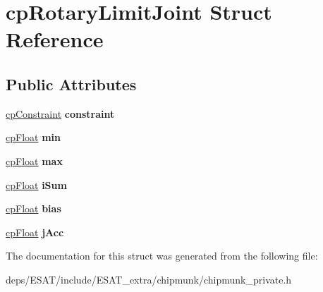 \hypertarget{structcp_rotary_limit_joint}{}\section{cp\+Rotary\+Limit\+Joint Struct Reference}
\label{structcp_rotary_limit_joint}
\subsection*{Public Attributes}
\begin{DoxyCompactItemize}
\item 
\mbox{\label{structcp_rotary_limit_joint_a447ab04f7ecace3c2cb7a9ad19e974ff}} 
\mbox{\hyperlink{structcp_constraint}{cp\+Constraint}} {\bfseries constraint}
\item 
\mbox{\label{structcp_rotary_limit_joint_aa189b3e6886001824f2ae140d69c7322}} 
\mbox{\hyperlink{group__basic_types_gac1ed65573e035bf892505768c852d8d3}{cp\+Float}} {\bfseries min}
\item 
\mbox{\label{structcp_rotary_limit_joint_a0706d6b4bcefcf85838256418ed3283e}} 
\mbox{\hyperlink{group__basic_types_gac1ed65573e035bf892505768c852d8d3}{cp\+Float}} {\bfseries max}
\item 
\mbox{\label{structcp_rotary_limit_joint_a5ec0c0943aa2f6afb90b114b8878bef5}} 
\mbox{\hyperlink{group__basic_types_gac1ed65573e035bf892505768c852d8d3}{cp\+Float}} {\bfseries i\+Sum}
\item 
\mbox{\label{structcp_rotary_limit_joint_a33bcd5092edad3f9e2d251c17fc18679}} 
\mbox{\hyperlink{group__basic_types_gac1ed65573e035bf892505768c852d8d3}{cp\+Float}} {\bfseries bias}
\item 
\mbox{\label{structcp_rotary_limit_joint_acd814943fe9a4065927ce4071d70adfd}} 
\mbox{\hyperlink{group__basic_types_gac1ed65573e035bf892505768c852d8d3}{cp\+Float}} {\bfseries j\+Acc}
\end{DoxyCompactItemize}


The documentation for this struct was generated from the following file\+:\begin{DoxyCompactItemize}
\item 
deps/\+E\+S\+A\+T/include/\+E\+S\+A\+T\+\_\+extra/chipmunk/chipmunk\+\_\+private.\+h\end{DoxyCompactItemize}
